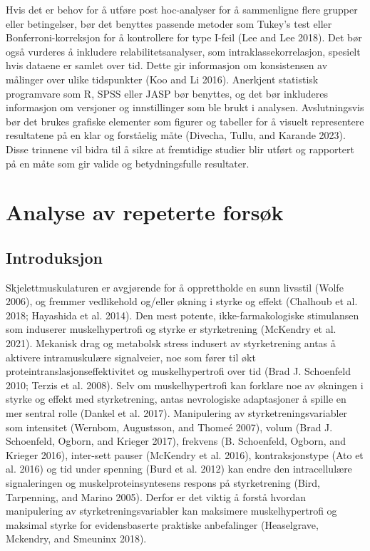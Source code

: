 \documentclass[
  letterpaper,
  DIV=11,
  numbers=noendperiod]{scrreprt}
\begin{document}
Hvis det er behov for å utføre post hoc-analyser for å sammenligne flere
grupper eller betingelser, bør det benyttes passende metoder som Tukey's
test eller Bonferroni-korreksjon for å kontrollere for type I-feil (Lee
and Lee 2018). Det bør også vurderes å inkludere relabilitetsanalyser,
som intraklassekorrelasjon, spesielt hvis dataene er samlet over tid.
Dette gir informasjon om konsistensen av målinger over ulike tidspunkter
(Koo and Li 2016). Anerkjent statistisk programvare som R, SPSS eller
JASP bør benyttes, og det bør inkluderes informasjon om versjoner og
innstillinger som ble brukt i analysen. Avslutningsvis bør det brukes
grafiske elementer som figurer og tabeller for å visuelt representere
resultatene på en klar og forståelig måte (Divecha, Tullu, and Karande
2023). Disse trinnene vil bidra til å sikre at fremtidige studier blir
utført og rapportert på en måte som gir valide og betydningsfulle
resultater.


\hypertarget{analyse-av-repeterte-forsuxf8k}{%
\chapter{Analyse av repeterte
forsøk}\label{analyse-av-repeterte-forsuxf8k}}

\hypertarget{introduksjon-1}{%
\section{Introduksjon}\label{introduksjon-1}}

Skjelettmuskulaturen er avgjørende for å opprettholde en sunn livsstil
(Wolfe 2006), og fremmer vedlikehold og/eller økning i styrke og effekt
(Chalhoub et al. 2018; Hayashida et al. 2014). Den mest potente,
ikke-farmakologiske stimulansen som induserer muskelhypertrofi og styrke
er styrketrening (McKendry et al. 2021). Mekanisk drag og metabolsk
stress indusert av styrketrening antas å aktivere intramuskulære
signalveier, noe som fører til økt proteintranslasjonseffektivitet og
muskelhypertrofi over tid (Brad J. Schoenfeld 2010; Terzis et al. 2008).
Selv om muskelhypertrofi kan forklare noe av økningen i styrke og effekt
med styrketrening, antas nevrologiske adaptasjoner å spille en mer
sentral rolle (Dankel et al. 2017). Manipulering av
styrketreningsvariabler som intensitet (Wernbom, Augustsson, and Thomeé
2007), volum (Brad J. Schoenfeld, Ogborn, and Krieger 2017), frekvens
(B. Schoenfeld, Ogborn, and Krieger 2016), inter-sett pauser (McKendry
et al. 2016), kontraksjonstype (Ato et al. 2016) og tid under spenning
(Burd et al. 2012) kan endre den intracellulære signaleringen og
muskelproteinsyntesens respons på styrketrening (Bird, Tarpenning, and
Marino 2005). Derfor er det viktig å forstå hvordan manipulering av
styrketreningsvariabler kan maksimere muskelhypertrofi og maksimal
styrke for evidensbaserte praktiske anbefalinger (Heaselgrave, Mckendry,
and Smeuninx 2018).
\end{document}
